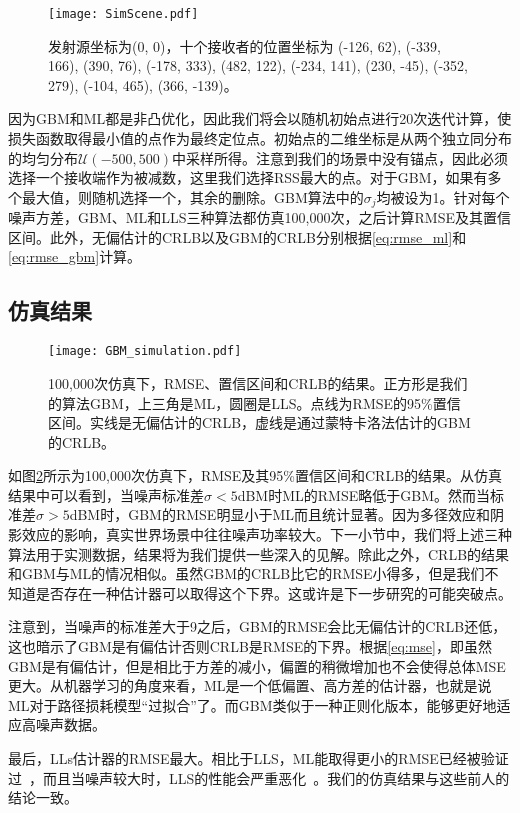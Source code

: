\begin{figure}
	\centering
	\texttt{[image: SimScene.pdf]}
	\caption{发射源坐标为(0, 0)，十个接收者的位置坐标为 (-126, 62), (-339, 166), (390, 76), (-178, 333), (482, 122), (-234, 141), (230, -45), (-352, 279), (-104, 465), (366, -139)。}
	\label{fig:simscene}
\end{figure}

因为GBM和ML都是非凸优化，因此我们将会以随机初始点进行20次迭代计算，使损失函数取得最小值的点作为最终定位点。初始点的二维坐标是从两个独立同分布的均匀分布$\mathcal{U}(-500, 500)$中采样所得。注意到我们的场景中没有锚点，因此必须选择一个接收端作为被减数，这里我们选择RSS最大的点。对于GBM，如果有多个最大值，则随机选择一个，其余的删除。GBM算法中的$\sigma_j$均被设为1。针对每个噪声方差，GBM、ML和LLS三种算法都仿真100,000次，之后计算RMSE及其置信区间。此外，无偏估计的CRLB以及GBM的CRLB分别根据\eqref{eq:rmse_ml}和\eqref{eq:rmse_gbm}计算。

\subsection{仿真结果}

\begin{figure}
	\centering
	\texttt{[image: GBM\_simulation.pdf]}
	\caption{100,000次仿真下，RMSE、置信区间和CRLB的结果。正方形是我们的算法GBM，上三角是ML，圆圈是LLS。点线为RMSE的95\%置信区间。实线是无偏估计的CRLB，虚线是通过蒙特卡洛法估计的GBM的CRLB。}
	\label{fig:gbm_sim}
\end{figure}

如图\ref{fig:gbm_sim}所示为100,000次仿真下，RMSE及其95\%置信区间和CRLB的结果。从仿真结果中可以看到，当噪声标准差$\sigma<5$dBM时ML的RMSE略低于GBM。然而当标准差$\sigma>5$dBM时，GBM的RMSE明显小于ML而且统计显著。因为多径效应和阴影效应的影响，真实世界场景中往往噪声功率较大。下一小节中，我们将上述三种算法用于实测数据，结果将为我们提供一些深入的见解。除此之外，CRLB的结果和GBM与ML的情况相似。虽然GBM的CRLB比它的RMSE小得多，但是我们不知道是否存在一种估计器可以取得这个下界。这或许是下一步研究的可能突破点。

注意到，当噪声的标准差大于9之后，GBM的RMSE会比无偏估计的CRLB还低，这也暗示了GBM是有偏估计否则CRLB是RMSE的下界。根据\eqref{eq:mse}，即虽然GBM是有偏估计，但是相比于方差的减小，偏置的稍微增加也不会使得总体MSE更大。从机器学习的角度来看，ML是一个低偏置、高方差的估计器，也就是说ML对于路径损耗模型“过拟合”了。而GBM类似于一种正则化版本，能够更好地适应高噪声数据。

最后，LLs估计器的RMSE最大。相比于LLS，ML能取得更小的RMSE已经被验证过~\cite{jackson2011received}，而且当噪声较大时，LLS的性能会严重恶化~\cite{vaghefi2013cooperative}。我们的仿真结果与这些前人的结论一致。

